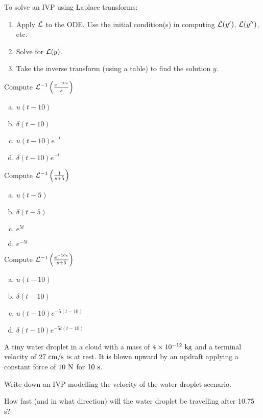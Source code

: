 \begin{applicationActivities}

\begin{observation}
To solve an IVP using Laplace transforms:
\begin{enumerate}[1)]
\item Apply \(\mathcal{L}\) to the ODE.  Use the initial condition(s) in computing \(\mathcal{L}(y')\), \(\mathcal{L}(y'')\), etc.
\item Solve for \(\mathcal{L}(y)\).
\item Take the inverse transform (using a table) to find the solution \(y\).
\end{enumerate}
\end{observation}

\begin{activity}{5}
Compute \(\mathcal{L}^{-1} \left( \frac{e^{-10s}}{s}\right) \)
\begin{enumerate}[(a)]
\item \(u(t-10)\)
\item \(\delta(t-10)\)
\item \(u(t-10)e^{-t}\)
\item \(\delta(t-10)e^{-t}\)
\end{enumerate}
\end{activity}


\begin{activity}{5}
Compute \(\mathcal{L}^{-1} \left( \frac{1}{s+5}\right) \)
\begin{enumerate}[(a)]
\item \(u(t-5)\)
\item \(\delta(t-5)\)
\item \(e^{5t}\)
\item \(e^{-5t}\)
\end{enumerate}
\end{activity}

\begin{activity}{5}
Compute \(\mathcal{L}^{-1} \left( \frac{e^{-10s}}{s+5}\right) \)
\begin{enumerate}[(a)]
\item \(u(t-10)\)
\item \(\delta(t-10)\)
\item \(u(t-10)e^{-5(t-10)}\)
\item \(\delta(t-10)e^{-5t(t-10)}\)
\end{enumerate}
\end{activity}




\begin{activity}{30}
A tiny water droplet in a cloud with a mass of \(4 \times 10^{-12}\ {\rm kg}\) and a terminal velocity of \(27\ {\rm cm/s}\) is at rest.  It is blown upward by an updraft applying a constant force of \(10\ {\rm N}\) for \(10\ {\rm s}\).
\begin{subactivity}
Write down an IVP modelling the velocity of the water droplet scenario.
\end{subactivity}
\begin{subactivity}
How fast (and in what direction) will the water droplet be travelling after 10.75 {\rm s}?
\end{subactivity}
\end{activity}


\end{applicationActivities}
